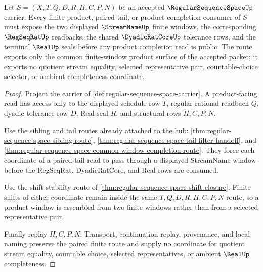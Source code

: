 \begin{theorem}
\label{thm:regular-sequence-space-product-window-route}
Let $S=(X,T,Q,D,R,H,C,P,N)$ be an accepted $\RegularSequenceSpaceUp$ carrier. Every finite product, paired-tail, or product-completion consumer of $S$ must expose the two displayed $\StreamNameUp$ finite windows, the corresponding $\RegSeqRatUp$ readbacks, the shared $\DyadicRatCoreUp$ tolerance rows, and the terminal $\RealUp$ seals before any product completion read is public. The route exports only the common finite-window product surface of the accepted packet; it exports no quotient stream equality, selected representative pair, countable-choice selector, or ambient completeness coordinate.
\end{theorem}
\begin{proof}
Project the carrier of \autoref{def:regular-sequence-space-carrier}. A product-facing read has access only to the displayed schedule row $T$, regular rational readback $Q$, dyadic tolerance row $D$, Real seal $R$, and structural rows $H,C,P,N$.

Use the sibling and tail routes already attached to the hub: \autoref{thm:regular-sequence-space-sibling-route}, \autoref{thm:regular-sequence-space-tail-filter-handoff}, and \autoref{thm:regular-sequence-space-common-window-completion-route}. They force each coordinate of a paired-tail read to pass through a displayed StreamName window before the RegSeqRat, DyadicRatCore, and Real rows are consumed.

Use the shift-stability route of \autoref{thm:regular-sequence-space-shift-closure}. Finite shifts of either coordinate remain inside the same $T,Q,D,R,H,C,P,N$ route, so a product window is assembled from two finite windows rather than from a selected representative pair.

Finally replay $H,C,P,N$. Transport, continuation replay, provenance, and local naming preserve the paired finite route and supply no coordinate for quotient stream equality, countable choice, selected representatives, or ambient $\RealUp$ completeness.
\end{proof}
